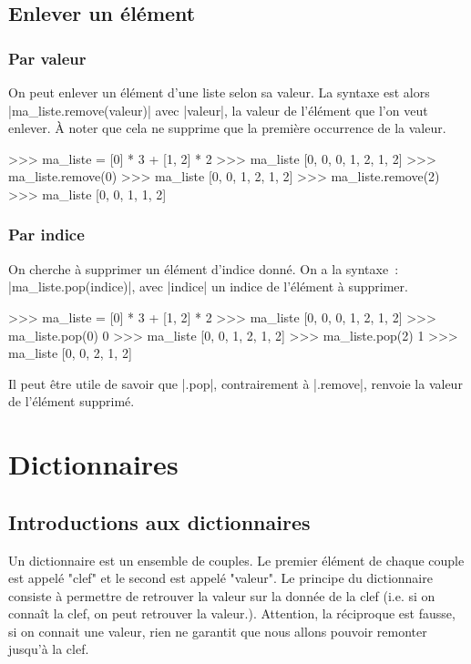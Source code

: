 	\subsection{Enlever un élément}
	
		\subsubsection{Par valeur}
		On peut enlever un élément d'une liste selon sa valeur. La syntaxe est alors \python|ma_liste.remove(valeur)| avec \python|valeur|, la valeur de l'élément que l'on veut enlever. À noter que cela ne supprime que la première occurrence de la valeur.
		\begin{pythoncode}
			>>> ma_liste = [0] * 3 + [1, 2] * 2
			>>> ma_liste
			[0, 0, 0, 1, 2, 1, 2]
			>>> ma_liste.remove(0)
			>>> ma_liste
			[0, 0, 1, 2, 1, 2]
			>>> ma_liste.remove(2)
			>>> ma_liste
			[0, 0, 1, 1, 2]
		\end{pythoncode}
		
		\subsubsection{Par indice} On cherche à supprimer un élément d'indice donné. On a la syntaxe~: \python|ma_liste.pop(indice)|, avec \python|indice| un indice de l'élément à supprimer.
		\begin{pythoncode}
			>>> ma_liste = [0] * 3 + [1, 2] * 2
			>>> ma_liste
			[0, 0, 0, 1, 2, 1, 2]
			>>> ma_liste.pop(0)
			0
			>>> ma_liste
			[0, 0, 1, 2, 1, 2]
			>>> ma_liste.pop(2)
			1
			>>> ma_liste
			[0, 0, 2, 1, 2]
		\end{pythoncode}
		Il peut être utile de savoir que \python|.pop|, contrairement à \python|.remove|, renvoie la valeur de l'élément supprimé.

\section{Dictionnaires}
	
	\subsection{Introductions aux dictionnaires}
		
		Un dictionnaire est un ensemble de couples. Le premier élément de chaque couple est appelé "clef" et le second est appelé "valeur".
		Le principe du dictionnaire consiste à permettre de retrouver la valeur sur la donnée de la clef (i.e. si on connaît la clef, on peut retrouver la valeur.). Attention, la réciproque est fausse, si on connait une valeur, rien ne garantit que nous allons pouvoir remonter jusqu'à la clef.
		
